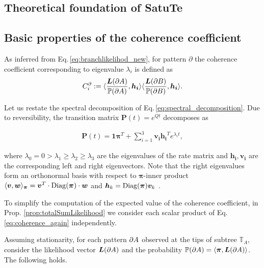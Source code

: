 \begin{appendices}
\setcounter{section}{2} 

\section{Theoretical foundation of SatuTe}\label{suppsec:maths}
\subsection{Basic properties of the coherence coefficient}
\label{sec:apx}

As inferred from Eq.\,\eqref{eq:branchlikelihod_new}, for pattern $\partial$ the coherence coefficient corresponding to eigenvalue $\lambda_i$ is defined as
\begin{equation} \label{eq:coherence_again}
    C^\partial_i := \langle \frac{{ \bm{L}(\partial A) }}{\mathbb{P}({\partial A})},\bm{h_i}\rangle \langle \frac{{ \bm{L}(\partial B) }}{\mathbb{P}({\partial B})}, \bm{h_i}\rangle.
\end{equation}

Let us restate the spectral decomposition of Eq.\,\eqref{eq:spectral_decomposition}. Due to reversibility, the transition matrix $\bm{P}(t) = e^{Qt}$ decomposes as 

\begin{align} \label{eq:spectral_decompositionAppendix}
   \bm{P}(t) = \bm{1}\bm{\pi}^T + \sum_{i=1}^3\bm{v_i} \bm{h_i}^T e^{\lambda_it},
\end{align}
 
where  ${\lambda_0 = 0 > \lambda_1 \geq \lambda_2 \geq \lambda_3}$  are the eigenvalues of the rate matrix and $\bm{h_i}, \bm{v_i}$  are the corresponding left and right eigenvectors. 
Note that the right eigenvalues form an orthonormal basis with respect to $\bm{\pi}$-inner product $\langle \bm{v},\bm{w}\rangle_{\bm{\pi}}= \bm{v}^T\cdot\operatorname{Diag}(\bm{\pi})\cdot\bm{w}$ and $\bm{h}_k=\operatorname{Diag}(\bm{\pi})\bm{v}_k$ .


\medskip


To simplify the computation of the expected value of the coherence coefficient, in Prop. \ref{prop:totalSumLikelihood} we consider each scalar product of Eq.\,\eqref{eq:coherence_again} independently.

\begin{prop}\label{prop:totalSumLikelihood} Assuming stationarity, for each pattern ${\partial A}$ observed at the tips of subtree $\mathbb{T}_A$, consider the likelihood vector ${ \bm{L}(\partial A) }$ and  the probability ${\mathbb{P}({\partial A}) = \langle \bm{\pi},  { \bm{L}(\partial A) } \rangle }$. The following holds.


\end{prop}
\end{appendices}
